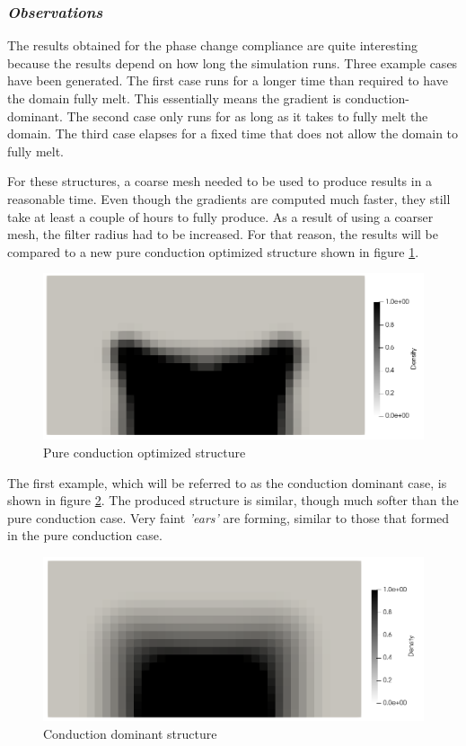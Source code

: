 \subsubsection*{\emph{Observations}}
The results obtained for the phase change compliance are quite interesting because the results depend on how long the simulation runs. Three example cases have been generated. The first case runs for a longer time than required to have the domain fully melt. This essentially means the gradient is conduction-dominant. The second case only runs for as long as it takes to fully melt the domain. The third case elapses for a fixed time that does not allow the domain to fully melt.

For these structures, a coarse mesh needed to be used to produce results in a reasonable time. Even though the gradients are computed much faster, they still take at least a couple of hours to fully produce. As a result of using a coarser mesh, the filter radius had to be increased. For that reason, the results will be compared to a new pure conduction optimized structure shown in figure \ref{fig:pure_conduction_comparison}.
\begin{figure}[ht]
  \centering
  \includegraphics[width=0.8\linewidth]{figures/chapter_4/PhaseChangeCoparison.png}
  \caption{Pure conduction optimized structure}
  \label{fig:pure_conduction_comparison}
\end{figure}

The first example, which will be referred to as the conduction dominant case, is shown in figure \ref{fig:conduction_dominant_structure}. The produced structure is similar, though much softer than the pure conduction case. Very faint \emph{'ears'} are forming, similar to those that formed in the pure conduction case.
\begin{figure}[ht]
  \centering
  \includegraphics[width=0.8\linewidth]{figures/chapter_4/PhaseChangeConductionDominant.png}
  \caption{Conduction dominant structure}
  \label{fig:conduction_dominant_structure}
\end{figure}

